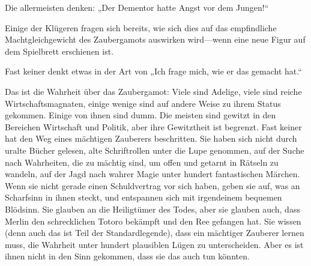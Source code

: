 Die allermeisten denken:
„Der Dementor hatte Angst vor dem Jungen!“

Einige der Klügeren fragen sich bereits, wie sich dies auf das empfindliche Machtgleichgewicht des Zaubergamots auswirken wird—wenn eine neue Figur auf dem Spielbrett erschienen ist.

Fast keiner denkt etwas in der Art von
„Ich frage mich, wie er das gemacht hat.“

Das ist die Wahrheit über das Zaubergamot: Viele sind Adelige, viele sind reiche Wirtschaftsmagnaten, einige wenige sind auf andere Weise zu ihrem Status gekommen. Einige von ihnen sind dumm. Die meisten sind gewitzt in den Bereichen Wirtschaft und Politik, aber ihre Gewitztheit ist begrenzt. Fast keiner hat den Weg eines mächtigen Zauberers beschritten. Sie haben sich nicht durch uralte Bücher gelesen, alte Schriftrollen unter die Lupe genommen, auf der Suche nach Wahrheiten, die zu mächtig sind, um offen und getarnt in Rätseln zu wandeln, auf der Jagd nach wahrer Magie unter hundert fantastischen Märchen. Wenn sie nicht gerade einen Schuldvertrag vor sich haben, geben sie auf, was an Scharfsinn in ihnen steckt, und entspannen sich mit irgendeinem bequemen Blödsinn. Sie glauben an die Heiligtümer des Todes, aber sie glauben auch, dass Merlin den schrecklichen Totoro bekämpft und den Ree gefangen hat. Sie wissen (denn auch das ist Teil der Standardlegende), dass ein mächtiger Zauberer lernen muss, die Wahrheit unter hundert plausiblen Lügen zu unterscheiden. Aber es ist ihnen nicht in den Sinn gekommen, dass sie das auch tun könnten.

